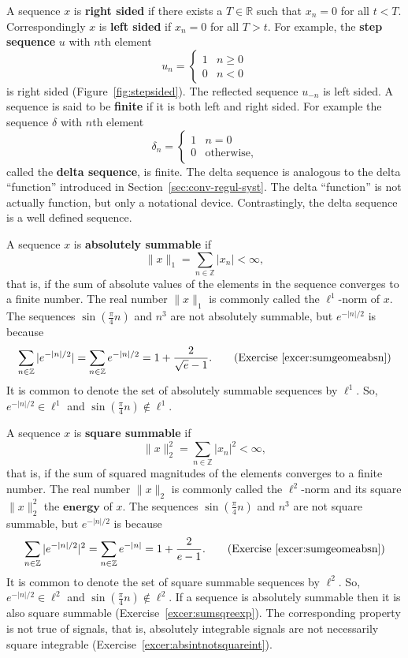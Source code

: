 \documentclass[11pt,a4paper]{book}
\theoremstyle{plain}
\numberwithin{equation}{section}
\newcommand{\reals}{{\mathbb R}}
\newcommand{\ints}{{\mathbb Z}}
\newcommand{\term}{\textbf}
\newcommand{\abs}[1]{\left\vert #1 \right\vert}
\newcommand{\sabs}[1]{\vert #1 \vert}
\begin{document}
A sequence $x$ is \term{right sided} if there exists a $T \in \reals$ such that $x_n = 0$ for all $t < T$.  Correspondingly $x$ is \term{left sided} if $x_n = 0$ for all $T > t$.  For example, the \term{step sequence} $u$ with $n$th element 
\begin{equation} \label{eq:stepsequence}
u_n = \begin{cases} 
1 & n \geq 0 \\
0 & n < 0 
\end{cases}
\end{equation}
is right sided  (Figure~\ref{fig:stepsided}).  The reflected sequence $u_{-n}$ is left sided.  A sequence is said to be \term{finite} if it is both left and right sided.  For example the sequence $\delta$ with $n$th element 
\begin{equation} \label{eq:deltasequence}
\delta_n = \begin{cases}
1 & n = 0 \\
0 & \text{otherwise},
\end{cases}
\end{equation}
called the \term{delta sequence}, is finite.  The delta sequence is analogous to the delta ``function'' introduced in Section~\ref{sec:conv-regul-syst}.  The delta ``function'' is not actually function, but only a notational device.  Contrastingly, the delta sequence is a well defined sequence.

A sequence $x$ is \term{absolutely summable} if
\[
\|x\|_1 = \sum_{n \in \ints} \sabs{x_n} < \infty,
\]
that is, if the sum of absolute values of the elements in the sequence converges to a finite number.  The real number $\|x\|_1$ is commonly called the $\ell^1$-norm of $x$.  The sequences $\sin(\tfrac{\pi}{4} n)$ and $n^3$ are not absolutely summable, but $e^{-\abs{n}/2}$ is because
\[
\sum_{n \in \ints} \sabs{e^{-\sabs{n}/2}} = \sum_{n \in \ints} e^{-\sabs{n}/2} = 1 + \frac{2}{\sqrt{e} - 1}. \qquad \text{(Exercise~\ref{excer:sumgeomeabsn})}
\]
It is common to denote the set of absolutely summable sequences by $\ell^1$.  So, $e^{-\sabs{n}/2} \in \ell^1$ and $\sin(\tfrac{\pi}{4} n) \notin \ell^1$.

A sequence $x$ is \term{square summable} if
\[
\|x\|_2^2 = \sum_{n \in \ints} \sabs{x_n}^2 < \infty,
\]
that is, if the sum of squared magnitudes of the elements converges to a finite number.  The real number $\|x\|_2$ is commonly called the $\ell^2$-norm and its square $\|x\|^2_2$ the $\term{energy}$ of $x$.  The sequences $\sin(\tfrac{\pi}{4} n)$ and $n^3$ are not square summable, but $e^{-\abs{n}/2}$ is because 
\[
\sum_{n \in \ints} \sabs{e^{-\sabs{n}/2}}^2 = \sum_{n \in \ints} e^{-\abs{n}} = 1 + \frac{2}{e - 1}. \qquad \text{(Exercise~\ref{excer:sumgeomeabsn})}
\]
It is common to denote the set of square summable sequences by $\ell^2$.  So, $e^{-\sabs{n}/2} \in \ell^2$ and $\sin(\tfrac{\pi}{4} n) \notin \ell^2$.  If a sequence is absolutely summable then it is also square summable (Exercise~\ref{excer:sumsqreexp}).  The corresponding property is not true of signals, that is, absolutely integrable signals are not necessarily square integrable (Exercise~\ref{excer:absintnotsquareint}).
\end{document}
